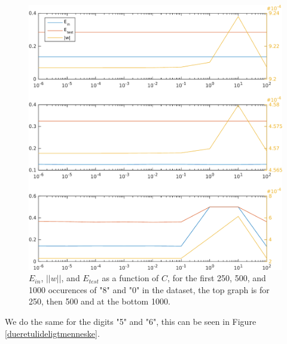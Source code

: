\begin{figure}
  \centering
  \includegraphics[width=\textwidth]{./08.pdf}
  \caption{$E_{in}$, $||w||$, and $E_{test}$ as a function of $C$, for the first 250, 500, and 1000 occurences of "8" and "0" in the dataset, the top graph is for 250, then 500 and at the bottom 1000.}
  \label{sutminfedepik}
\end{figure}
\noindent We do the same for the digits "5" and "6", this can be seen in Figure \ref{dueretulideligtmenneske}.
